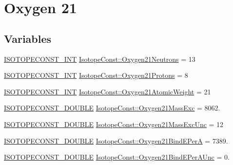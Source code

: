 \hypertarget{group___isotope_const-_oxygen-_o21}{}\section{Oxygen 21}
\label{group___isotope_const-_oxygen-_o21}
\subsection*{Variables}
\begin{DoxyCompactItemize}
\item 
\mbox{\hyperlink{group___isotope_const-_macros_ga5f18360b3e99483a35c32d789e62621c}{I\+S\+O\+T\+O\+P\+E\+C\+O\+N\+S\+T\+\_\+\+I\+NT}} \mbox{\hyperlink{group___isotope_const-_oxygen-_o21_gab0dee11a43f17c7bcddeb9e2bdf38b80}{Isotope\+Const\+::\+Oxygen21\+Neutrons}} = 13
\item 
\mbox{\hyperlink{group___isotope_const-_macros_ga5f18360b3e99483a35c32d789e62621c}{I\+S\+O\+T\+O\+P\+E\+C\+O\+N\+S\+T\+\_\+\+I\+NT}} \mbox{\hyperlink{group___isotope_const-_oxygen-_o21_gafee01e0f0281fb98bcd6e4bbba6518de}{Isotope\+Const\+::\+Oxygen21\+Protons}} = 8
\item 
\mbox{\hyperlink{group___isotope_const-_macros_ga5f18360b3e99483a35c32d789e62621c}{I\+S\+O\+T\+O\+P\+E\+C\+O\+N\+S\+T\+\_\+\+I\+NT}} \mbox{\hyperlink{group___isotope_const-_oxygen-_o21_ga8deb85c2f8b91d63f303f3c0bff7427a}{Isotope\+Const\+::\+Oxygen21\+Atomic\+Weight}} = 21
\item 
\mbox{\hyperlink{group___isotope_const-_macros_ga8f45a7272ce02c0b4c65c44636ed719a}{I\+S\+O\+T\+O\+P\+E\+C\+O\+N\+S\+T\+\_\+\+D\+O\+U\+B\+LE}} \mbox{\hyperlink{group___isotope_const-_oxygen-_o21_ga873f5f0132d932406a43f0c7a16f4e9a}{Isotope\+Const\+::\+Oxygen21\+Mass\+Exc}} = 8062.
\item 
\mbox{\hyperlink{group___isotope_const-_macros_ga8f45a7272ce02c0b4c65c44636ed719a}{I\+S\+O\+T\+O\+P\+E\+C\+O\+N\+S\+T\+\_\+\+D\+O\+U\+B\+LE}} \mbox{\hyperlink{group___isotope_const-_oxygen-_o21_ga5a7a063222ac3faeb05cc721a03fd5ba}{Isotope\+Const\+::\+Oxygen21\+Mass\+Exc\+Unc}} = 12
\item 
\mbox{\hyperlink{group___isotope_const-_macros_ga8f45a7272ce02c0b4c65c44636ed719a}{I\+S\+O\+T\+O\+P\+E\+C\+O\+N\+S\+T\+\_\+\+D\+O\+U\+B\+LE}} \mbox{\hyperlink{group___isotope_const-_oxygen-_o21_ga0a41409ad0606d58bdfbe54e240db187}{Isotope\+Const\+::\+Oxygen21\+Bind\+E\+PerA}} = 7389.
\item 
\mbox{\hyperlink{group___isotope_const-_macros_ga8f45a7272ce02c0b4c65c44636ed719a}{I\+S\+O\+T\+O\+P\+E\+C\+O\+N\+S\+T\+\_\+\+D\+O\+U\+B\+LE}} \mbox{\hyperlink{group___isotope_const-_oxygen-_o21_ga6af54194c24c9d9d976f204e26321c91}{Isotope\+Const\+::\+Oxygen21\+Bind\+E\+Per\+A\+Unc}} = 0.

\end{DoxyCompactItemize}
